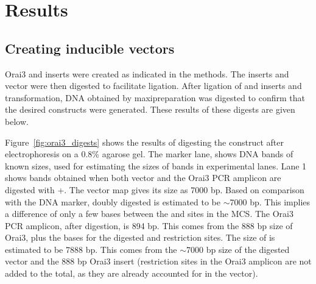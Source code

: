 \chapter{Results}



  

\section{Creating inducible vectors}
Orai3 and \stim{} inserts were created as indicated in the methods. The inserts and \puchygmt{} vector were then digested to facilitate ligation. After ligation of \puchygmt{} and inserts and transformation, DNA obtained by maxipreparation was digested to confirm that the desired constructs were generated.  These results of these digests are given below.

Figure~\ref{fig:orai3_digests} shows the results of digesting the \oraiiiivector{} construct after electrophoresis on a 0.8\% agarose gel. The marker lane, shows DNA bands of known sizes, used for estimating the sizes of bands in experimental lanes.  Lane 1 shows bands obtained when both \puchygmt{} vector and the Orai3 PCR amplicon are digested with \sali+\xbai. The \puchygmt{} vector map gives its size as 7000 bp. Based on comparison with the DNA marker, doubly digested \puchygmt{} is estimated to be $\sim$7000 bp. This implies a difference of only a few bases between the \sali{} and \xbai{} sites in the MCS. The Orai3 PCR amplicon, after digestion, is 894 bp. This comes from the 888 bp size of Orai3, plus the bases for the digested \sali{} and \xbai{} restriction sites. The size of \oraiiiivector{} is estimated to be 7888 bp. This comes from the $\sim$7000 bp size of the digested vector and the 888 bp Orai3 insert  (restriction sites in the Orai3 amplicon are not added to the total, as they are already accounted for in the vector). 


